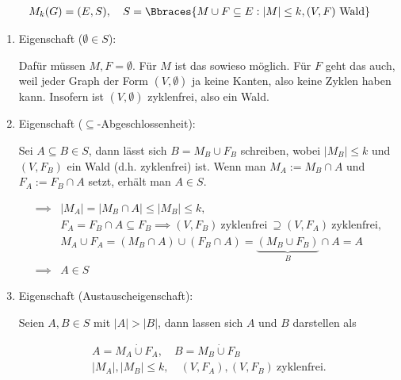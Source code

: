 \begin{solution}

\begin{align*}
    M_k(G) = (E, S),
    \quad
    S = \Bbraces
    {
        M \cup F \subseteq E:
        |M| \leq k,
        (V, F) ~\text{Wald}
    }
\end{align*}

\begin{enumerate}[label = \arabic*.]

    \item Eigenschaft ($\emptyset \in S$):
    
    Dafür müssen $M, F = \emptyset$.
    Für $M$ ist das sowieso möglich.
    Für $F$ geht das auch, weil jeder Graph der Form $(V, \emptyset)$ ja keine Kanten, also keine Zyklen haben kann.
    Insofern ist $(V, \emptyset)$ zyklenfrei, also ein Wald.

    \item Eigenschaft ($\subseteq$-Abgeschlossenheit):

    Sei $A \subseteq B \in S$, dann lässt sich $B = M_B \cup F_B$ schreiben, wobei $|M_B| \leq k$ und $(V, F_B)$ ein Wald (d.h. zyklenfrei) ist.
    Wenn man $M_A := M_B \cap A$ und $F_A := F_B \cap A$ setzt, erhält man $A \in S$.

    \begin{align*}
        \implies
        & |M_A| = |M_B \cap A| \leq |M_B| \leq k, \\
        & F_A = F_B \cap A \subseteq F_B
        \implies
        (V, F_B) ~\text{zyklenfrei}~
        \supseteq
        (V, F_A) ~\text{zyklenfrei}, \\
        & M_A \cup F_A
        =
        (M_B \cap A) \cup (F_B \cap A)
        =
        \underbrace
        {
            (M_B \cup F_B)
        }_B
        \cap A
        =
        A \\
        \implies
        & A \in S
    \end{align*}

    \item Eigenschaft (Austauscheigenschaft):

    Seien $A, B \in S$ mit $|A| > |B|$, dann lassen sich $A$ und $B$ darstellen als

    \begin{gather*}
        A = M_A \dot \cup F_A,
        \quad
        B = M_B \dot \cup F_B \\
        |M_A|, |M_B| \leq k,
        \quad
        (V, F_A), (V, F_B) ~\text{zyklenfrei}.
    \end{gather*}


\end{enumerate}
\end{solution}
